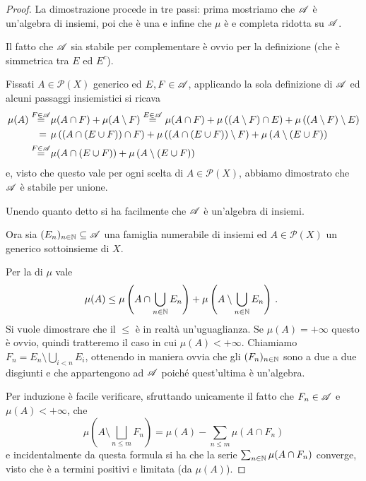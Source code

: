 \begin{proof}
	La dimostrazione procede in tre passi: prima mostriamo che $\mathscr A$ è un'algebra di insiemi, poi che è una \sigalg{} e infine che $\mu$ è \sigadd{} e completa ridotta su $\mathscr A$.
	
	Il fatto che $\mathscr A$ sia stabile per complementare è ovvio per la definizione (che è simmetrica tra $E$ ed $E^c$).
	
	Fissati $A\in\mathcal P(X)$ generico ed $E,F\in\mathscr A$, applicando la sola definizione di $\mathscr A$ ed alcuni passaggi insiemistici si ricava
	\begin{align*}
		\mu(A)\stackrel{F\in\mathscr A}{=}&\mu(A\cap F)+\mu(A\setminus F)\stackrel{E\in\mathscr A}{=}
		\mu(A\cap F)+\mu\left((A\setminus F)\cap E\right)+\mu\left((A\setminus F)\setminus E\right)\\
		=\hspace{0.4em}&\mu\left((A\cap (E\cup F))\cap F\right)+\mu\left((A\cap (E\cup F))\setminus F\right)+
		\mu\left(A\setminus(E\cup F)\right)\\
		\stackrel{F\in\mathscr A}{=}&\mu(A\cap (E\cup F))+\mu\left(A\setminus(E\cup F)\right)
	\end{align*}
	e, visto che questo vale per ogni scelta di $A\in\mathcal P(X)$, abbiamo dimostrato che $\mathscr A$ è stabile per unione.
	
	Unendo quanto detto si ha facilmente che $\mathscr A$ è un'algebra di insiemi.
	
	Ora sia $(E_n)_{n\in\mathbb N}\subseteq \mathscr A$ una famiglia numerabile di insiemi ed $A\in\mathcal P(X)$ un generico sottoinsieme di $X$.
	
	Per la \sigsubadd[ità] di $\mu$ vale
	\begin{equation}\label{eq:DisuguaglianzaFacileCaratheodory}
		\mu(A)\le \mu\left(A\cap\bigcup_{n\in\mathbb N} E_n\right)+\mu\left(A\setminus\bigcup_{n\in\mathbb N} E_n\right) \, \text{. }
	\end{equation}
	Si vuole dimostrare che il $\le$ è in realtà un'uguaglianza. Se $\mu(A)=+\infty$ questo è ovvio, quindi tratteremo il caso in cui $\mu(A)<+\infty$. Chiamiamo $F_n=E_n\setminus \bigcup_{i<n} E_i$, ottenendo in maniera ovvia che gli $(F_n)_{n\in\mathbb N}$ sono a due a due disgiunti e che appartengono ad $\mathscr A$ poiché quest'ultima è un'algebra.
	
	Per induzione è facile verificare, sfruttando unicamente il fatto che $F_n\in\mathscr A$ e $\mu(A)<+\infty$, che 
	\begin{equation}\label{eq:IdentitaDifferenzaCaratheodory}
		\mu\left(A\setminus \bigsqcup_{n\le m} F_n\right)=\mu(A)-\sum_{n\le m} \mu(A\cap F_n)
	\end{equation}
	e incidentalmente da questa formula si ha che la serie $\sum_{n\in\mathbb N}\mu(A\cap F_n)$ converge, visto che è a termini positivi e limitata (da $\mu(A)$).
	

\end{proof}
